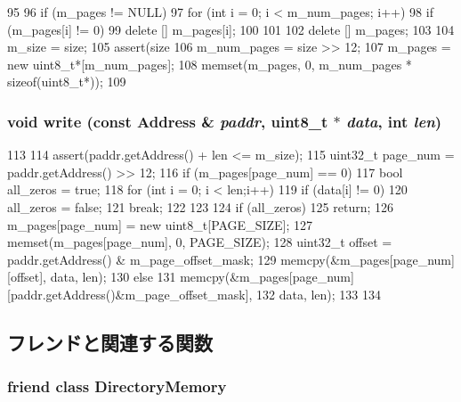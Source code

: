 \begin{DoxyCode}
95 {
96     if (m_pages != NULL){
97         for (int i = 0; i < m_num_pages; i++) {
98             if (m_pages[i] != 0) {
99                 delete [] m_pages[i];
100             }
101         }
102         delete [] m_pages;
103     }
104     m_size = size;
105     assert(size%
106     m_num_pages = size >> 12;
107     m_pages = new uint8_t*[m_num_pages];
108     memset(m_pages, 0, m_num_pages * sizeof(uint8_t*));
109 }
\end{DoxyCode}
\hypertarget{classMemoryVector_a8ec391c8b51d1738602ab13bc1d4c78e}{
\subsubsection[{write}]{\setlength{\rightskip}{0pt plus 5cm}void write (const {\bf Address} \& {\em paddr}, \/  uint8\_\-t $\ast$ {\em data}, \/  int {\em len})}}
\label{classMemoryVector_a8ec391c8b51d1738602ab13bc1d4c78e}



\begin{DoxyCode}
113 {
114     assert(paddr.getAddress() + len <= m_size);
115     uint32_t page_num = paddr.getAddress() >> 12;
116     if (m_pages[page_num] == 0) {
117         bool all_zeros = true;
118         for (int i = 0; i < len;i++) {
119             if (data[i] != 0) {
120                 all_zeros = false;
121                 break;
122             }
123         }
124         if (all_zeros)
125             return;
126         m_pages[page_num] = new uint8_t[PAGE_SIZE];
127         memset(m_pages[page_num], 0, PAGE_SIZE);
128         uint32_t offset = paddr.getAddress() & m_page_offset_mask;
129         memcpy(&m_pages[page_num][offset], data, len);
130     } else {
131         memcpy(&m_pages[page_num][paddr.getAddress()&m_page_offset_mask],
132                data, len);
133     }
134 }
\end{DoxyCode}


\subsection{フレンドと関連する関数}
\hypertarget{classMemoryVector_a40907c9241cfbaf58daf0c9c7a4a9edd}{
\subsubsection[{DirectoryMemory}]{\setlength{\rightskip}{0pt plus 5cm}friend class {\bf DirectoryMemory}}}
\label{classMemoryVector_a40907c9241cfbaf58daf0c9c7a4a9edd}


